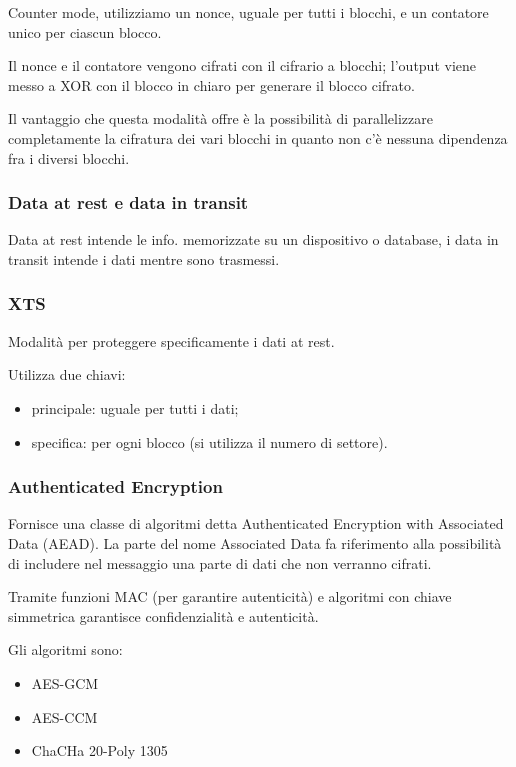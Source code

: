 Counter mode, utilizziamo un nonce, uguale per tutti i blocchi, e un
contatore unico per ciascun blocco.

Il nonce e il contatore vengono cifrati con il cifrario a blocchi;
l'output viene messo a XOR con il blocco in chiaro per generare il
blocco cifrato.

Il vantaggio che questa modalità offre è la possibilità di
parallelizzare completamente la cifratura dei vari blocchi in quanto non
c'è nessuna dipendenza fra i diversi blocchi.

\subsubsection{Data at rest e data in
transit}\label{data-at-rest-e-data-in-transit}

Data at rest intende le info. memorizzate su un dispositivo o database,
i data in transit intende i dati mentre sono trasmessi.

\subsubsection{XTS}\label{xts}

Modalità per proteggere specificamente i dati at rest.

Utilizza due chiavi:

\begin{itemize}
\item
  principale: uguale per tutti i dati;
\item
  specifica: per ogni blocco (si utilizza il numero di settore).
\end{itemize}

\subsubsection{Authenticated Encryption}\label{authenticated-encryption}

Fornisce una classe di algoritmi detta Authenticated Encryption with
Associated Data (AEAD). La parte del nome Associated Data fa riferimento
alla possibilità di includere nel messaggio una parte di dati che non
verranno cifrati.

Tramite funzioni MAC (per garantire autenticità) e algoritmi con chiave
simmetrica garantisce confidenzialità e autenticità.

Gli algoritmi sono:

\begin{itemize}
\item
  AES-GCM
\item
  AES-CCM
\item
  ChaCHa 20-Poly 1305
\end{itemize}

